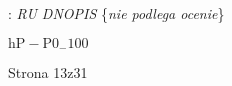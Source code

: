 \documentclass[a4paper,12pt]{article}
\begin{document}
: {\it RU DNOPIS} \{{\it nie podlega ocenie}\}

$\mathrm{h}\mathrm{P}-\mathrm{P}0_{-}100$

Strona 13z31
\end{document}
